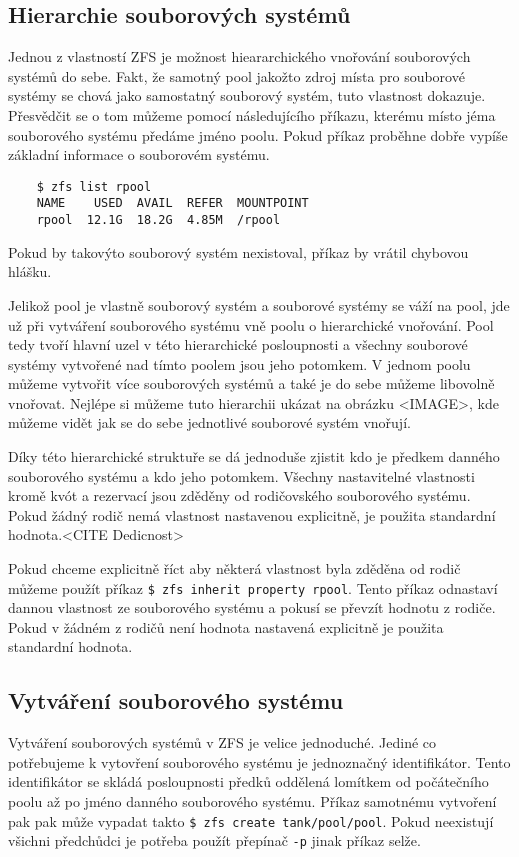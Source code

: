     \subsection{Hierarchie souborových systémů}
    \label{hiararchy}
    Jednou z vlastností ZFS je možnost hieararchického vnořování souborových systémů do sebe. Fakt, že samotný pool jakožto zdroj místa pro souborové systémy se chová jako samostatný souborový systém, tuto vlastnost dokazuje. Přesvědčit se o tom můžeme pomocí následujícího příkazu, kterému místo jéma souborového systému předáme jméno poolu. Pokud příkaz proběhne dobře vypíše základní informace o souborovém systému.
    \begin{verbatim}
    $ zfs list rpool
    NAME    USED  AVAIL  REFER  MOUNTPOINT
    rpool  12.1G  18.2G  4.85M  /rpool
    \end{verbatim}
    Pokud by takovýto souborový systém nexistoval, příkaz by vrátil chybovou hlášku.

    Jelikož pool je vlastně souborový systém a souborové systémy se váží na pool, jde už při vytváření souborového systému vně poolu o hierarchické vnořování. Pool tedy tvoří hlavní uzel v této hierarchické posloupnosti a všechny souborové systémy vytvořené nad tímto poolem jsou jeho potomkem. V jednom poolu můžeme vytvořit více souborových systémů a také je do sebe můžeme libovolně vnořovat. Nejlépe si můžeme tuto hierarchii ukázat na obrázku <IMAGE>, kde můžeme vidět jak se do sebe jednotlivé souborové systém vnořují.

    Díky této hierarchické struktuře se dá jednoduše zjistit kdo je předkem danného souborového systému a kdo jeho potomkem. Všechny nastavitelné vlastnosti kromě kvót a rezervací jsou zděděny od rodičovského souborového systému. Pokud žádný rodič nemá vlastnost nastavenou explicitně, je použita standardní hodnota.<CITE Dedicnost>

    Pokud chceme explicitně říct aby některá vlastnost byla zděděna od rodič můžeme použít příkaz \verb|$ zfs inherit property rpool|. Tento příkaz odnastaví dannou vlastnost ze souborového systému a pokusí se převzít hodnotu z rodiče. Pokud v žádném z rodičů není hodnota nastavená explicitně je použita standardní hodnota.
    \subsection{Vytváření souborového systému}
    \label{createfs}
    Vytváření souborových systémů v ZFS je velice jednoduché. Jediné co potřebujeme k vytovření souborového systému je jednoznačný identifikátor. Tento identifikátor se skládá posloupnosti předků oddělená lomítkem od počátečního poolu až po jméno danného souborového systému. Příkaz samotnému vytvoření pak pak může vypadat takto \verb|$ zfs create tank/pool/pool|. Pokud neexistují všichni předchůdci je potřeba použít přepínač \verb|-p| jinak příkaz selže.

